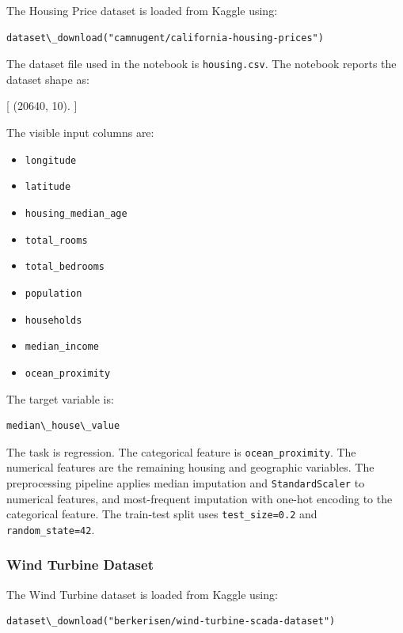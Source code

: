 The Housing Price dataset is loaded from Kaggle using:

\begin{verbatim}
dataset\_download("camnugent/california-housing-prices")
\end{verbatim}

The dataset file used in the notebook is \texttt{housing.csv}. The notebook reports the dataset shape as:

[
    (20640, 10).
]

The visible input columns are:

\begin{itemize}
    \item \texttt{longitude}
    \item \texttt{latitude}
    \item \texttt{housing\_median\_age}
    \item \texttt{total\_rooms}
    \item \texttt{total\_bedrooms}
    \item \texttt{population}
    \item \texttt{households}
    \item \texttt{median\_income}
    \item \texttt{ocean\_proximity}
\end{itemize}

The target variable is:

\begin{verbatim}
median\_house\_value
\end{verbatim}

The task is regression. The categorical feature is \texttt{ocean\_proximity}. The numerical features are the remaining housing and geographic variables. The preprocessing pipeline applies median imputation and \texttt{StandardScaler} to numerical features, and most-frequent imputation with one-hot encoding to the categorical feature. The train-test split uses \texttt{test\_size=0.2} and \texttt{random\_state=42}.

\subsubsection{Wind Turbine Dataset}

The Wind Turbine dataset is loaded from Kaggle using:

\begin{verbatim}
dataset\_download("berkerisen/wind-turbine-scada-dataset")
\end{verbatim}

